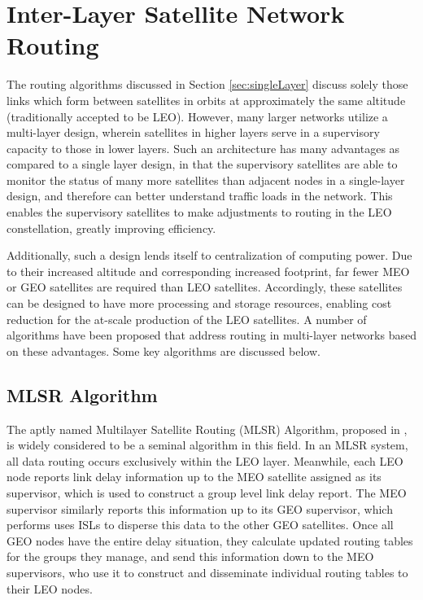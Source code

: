 
\section{Inter-Layer Satellite Network Routing}\label{sec:interLayer}
The routing algorithms discussed in Section \ref{sec:singleLayer} discuss solely those links which form between satellites in orbits at approximately the same altitude (traditionally accepted to be LEO). However, many larger networks utilize a multi-layer design, wherein satellites in higher layers serve in a supervisory capacity to those in lower layers. Such an architecture has many advantages as compared to a single layer design, in that the supervisory satellites are able to monitor the status of many more satellites than adjacent nodes in a single-layer design, and therefore can better understand traffic loads in the network. This enables the supervisory satellites to make adjustments to routing in the LEO constellation, greatly improving efficiency. 

Additionally, such a design lends itself to centralization of computing power. Due to their increased altitude and corresponding increased footprint, far fewer MEO or GEO satellites are required than LEO satellites. Accordingly, these satellites can be designed to have more processing and storage resources, enabling cost reduction for the at-scale production of the LEO satellites. A number of algorithms have been proposed that address routing in multi-layer networks based on these advantages. Some key algorithms are discussed below.

\subsection{MLSR Algorithm}\label{subsec:mlsr}
The aptly named Multilayer Satellite Routing (MLSR) Algorithm, proposed in \cite{akyildiz_mlsr_2002}, is widely considered to be a seminal algorithm in this field. In an MLSR system, all data routing occurs exclusively within the LEO layer. Meanwhile, each LEO node reports link delay information up to the MEO satellite assigned as its supervisor, which is used to construct a group level link delay report. The MEO supervisor similarly reports this information up to its GEO supervisor, which performs uses ISLs to disperse this data to the other GEO satellites. Once all GEO nodes have the entire delay situation, they calculate updated routing tables for the groups they manage, and send this information down to the MEO supervisors, who use it to construct and disseminate individual routing tables to their LEO nodes.


